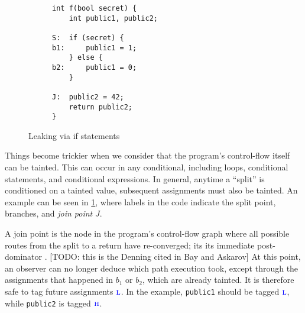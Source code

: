 \documentclass{llncs}
\begin{document}
{\begin{figure}[t]
  \begin{subfigure}{0.4\textwidth}
\begin{verbatim}
int f(bool secret) {
    int public1, public2;

S:  if (secret) {
b1:     public1 = 1;
    } else {
b2:     public1 = 0;
    }

J:  public2 = 42;
    return public2;
}
\end{verbatim}
  \end{subfigure}
  \begin{subfigure}{0.6\textwidth}
  \end{subfigure}
\caption{Leaking via if statements}
\label{fig:ifthenelse}  
\end{figure}

Things become trickier when we consider that the program's control-flow itself can be tainted.
This can occur in any conditional, including loops, conditional statements, and conditional expressions.
In general, anytime a ``split'' is conditioned on a tainted value, subsequent assignments must also be tainted.
An example can be seen in \cref{fig:ifthenelse}, where labels in the code indicate the split
point, branches, and {\em join point} \(J\).

A join point is the node in the program's control-flow graph where all possible routes
from the split to a return have re-converged; its its immediate post-dominator \cite{}.
[TODO: this is the Denning cited in Bay and Askarov] At this point, an observer can no
longer deduce which path execution took, except through the assignments that happened
in \(b_1\) or \(b_2\), which are already tainted. It is therefore safe to tag future
assignments \(\textnormal{\color{blue} \sc l}\). In the example, {\tt public1} should be tagged \(\textnormal{\color{blue} \sc l}\), while
{\tt public2} is tagged \(\textnormal{\color{blue} \sc h}\).

}
\end{document}

